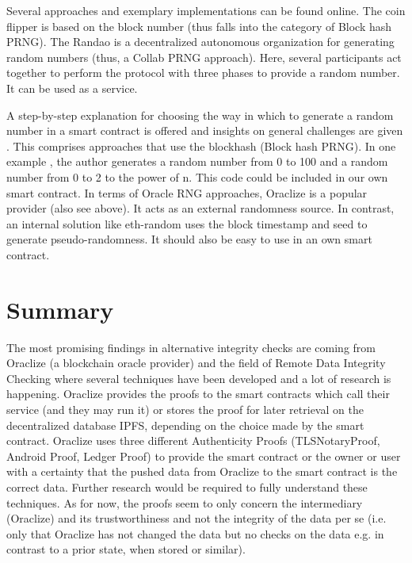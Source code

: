 Several approaches and exemplary implementations can be found online.
The coin flipper \cite{relatedWork23} is based on the block number (thus falls into the category of Block hash PRNG). The Randao \cite{relatedWork24} is a decentralized autonomous organization for generating random numbers (thus, a Collab PRNG approach). Here, several participants act together to perform the protocol with three phases to provide a random number. It can be used as a service.

A step-by-step explanation for choosing the way in which to generate a random number in a smart contract is offered and insights on general challenges are given \cite{relatedWork25}. This comprises approaches that use the blockhash (Block hash PRNG).
In one example \cite{relatedWork26}, the author generates a random number from 0 to 100 and a random number from 0 to 2 to the power of n. This code could be included in our own smart contract.
In terms of Oracle RNG approaches, Oraclize \cite{relatedWork07} is a popular provider (also see above). It acts as an external randomness source.
In contrast, an internal solution like eth-random \cite{relatedWork27} uses the block timestamp and seed to generate pseudo-randomness. It should also be easy to use in an own smart contract.

\section{Summary}

The most promising findings in alternative integrity checks are coming from Oraclize (a blockchain oracle provider) and the field of Remote Data Integrity Checking where several techniques have been developed and a lot of research is happening.
Oraclize provides the proofs to the smart contracts which call their service (and they may run it) or stores the proof for later retrieval on the decentralized database IPFS, depending on the choice made by the smart contract. Oraclize uses three different Authenticity Proofs (TLSNotaryProof, Android Proof, Ledger Proof) to provide the smart contract or the owner or user with a certainty that the pushed data from Oraclize to the smart contract is the correct data. Further research would be required to fully understand these techniques. As for now, the proofs seem to only concern the intermediary (Oraclize) and its trustworthiness and not the integrity of the data per se (i.e. only that Oraclize has not changed the data but no checks on the data e.g. in contrast to a prior state, when stored or similar).

